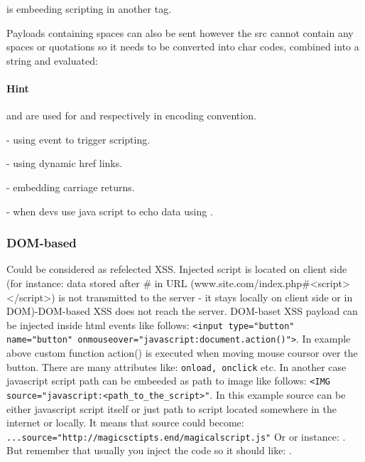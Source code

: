  is embeeding scripting in another tag.


Payloads containing spaces can also be sent however the src cannot contain any spaces or quotations so it needs to be converted into char codes, combined into a string and evaluated: \newline
{} \newline

\paragraph{Hint}  and  are used for \q{<} and \q{>} respectively in encoding convention.\newline

 - using event to trigger scripting.\newline

 - using dynamic href links.\newline

 - embedding carriage returns.\newline

 - when devs use java script to echo data using .\newline


\subsubsection{DOM-based} Could be considered as refelected XSS. Injected script is located on client side (for instance: data stored after \# in URL (www.site.com/index.php\#<script></script>) is not transmitted to the server - it stays locally on client side or in DOM)-DOM-based XSS does not reach the server.
DOM-baset XSS payload can be injected inside html events like follows: \texttt{<input type="button" name="button" onmouseover="javascript:document.action()">}.
In example above custom function action() is executed when moving mouse coursor over the button.
There are many attributes like: \texttt{onload, onclick} etc.
In another case javascript script path can be embeeded as path to image like follows:
\texttt{<IMG source="javascript:<path\_to\_the\_script>"}.
In this example source can be either javascript script itself or just path to script located somewhere in the internet or locally.
It means that source could become:
\texttt{...source="http://magicsctipts.end/magicalscript.js"}
Or or instance: .
But remember that usually you inject the code so it should like: .



